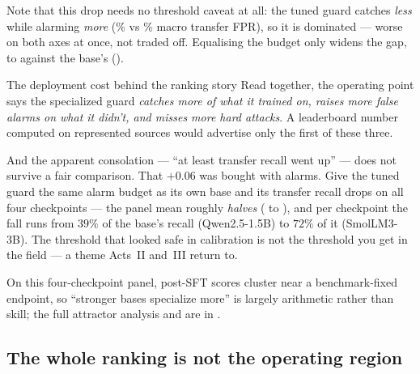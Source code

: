 Note that this  drop needs no threshold caveat at all: the tuned guard catches
\emph{less} while alarming \emph{more} (\TransferSFTFPRPct\% vs \TransferBaseFPRPct\% macro transfer
FPR), so it is dominated --- worse on both axes at once, not traded off. Equalising the budget only
widens the gap, to \MatchedHarmSft{} against the base's \MatchedHarmBase{} ().

\begin{table}[htbp]\centering\small\setlength{\tabcolsep}{4.5pt}
\caption{Act I --- per-benchmark paired deltas (upper) and the calibration-targeted $5\%$ FPR operating
point plus single-class stress diagnostics (lower). Generated from the lock-bound scores.}
\label{tab:sensitivity}

\end{table}



\begin{takeaway}{The deployment cost behind the ranking story}
Read together, the operating point says the specialized guard \emph{catches more of what it trained on,
raises more false alarms on what it didn't, and misses more hard attacks}. A leaderboard number computed
on represented sources would advertise only the first of these three.

And the apparent consolation --- ``at least transfer recall went up'' --- does not survive a fair
comparison. That $+0.06$ was bought with alarms. Give the tuned guard the same alarm budget as its own
base and its transfer recall drops on all four checkpoints --- the panel mean roughly \emph{halves}
(\MatchedTransferBase{} to \MatchedTransferSft{}), and per checkpoint the fall runs from $39\%$ of the
base's recall (Qwen2.5-1.5B) to $72\%$ of it (SmolLM3-3B). The threshold that looked safe in calibration is not the threshold you get in the field ---
a theme Acts~II and~III return to.
\end{takeaway}

\noindent On this four-checkpoint panel, post-SFT scores cluster near a benchmark-fixed endpoint, so ``stronger bases specialize more'' is largely arithmetic rather than skill; the full attractor analysis and  are in .

\subsection{The whole ranking is not the operating region}
\label{sec:actI-lowfpr}

